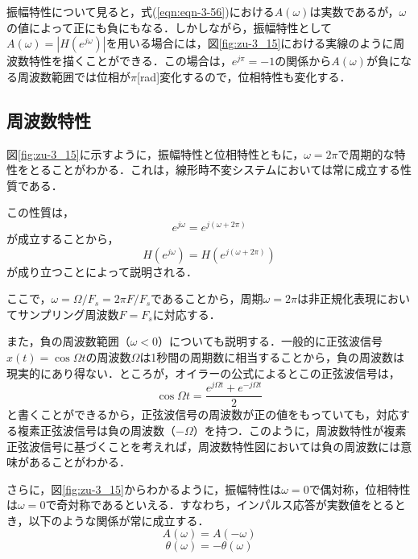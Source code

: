 振幅特性について見ると，式(\ref{eqn:eqn-3-56})における$A(\omega)$は実数であるが，$\omega$の値によって正にも負にもなる．しかしながら，振幅特性として$A(\omega)=|H(e^{j\omega})|$を用いる場合には，図\ref{fig:zu-3_15}における実線のように周波数特性を描くことができる．この場合は，$e^{j\pi}=-1$の関係から$A(\omega)$が負になる周波数範囲では位相が$\pi$[rad]変化するので，位相特性も変化する．


\subsection{周波数特性}

図\ref{fig:zu-3_15}に示すように，振幅特性と位相特性ともに，$\omega=2\pi$で周期的な特性をとることがわかる．これは，線形時不変システムにおいては常に成立する性質である．

この性質は，
\begin{equation}
e^{j\omega}=e^{j(\omega+2\pi)}
\end{equation}
が成立することから，
\begin{equation}
H(e^{j\omega})=H(e^{j(\omega+2\pi)})
\end{equation}
が成り立つことによって説明される．

ここで，$\omega=\Omega/F_s=2\pi F/F_s$であることから，周期$\omega=2\pi$は非正規化表現においてサンプリング周波数$F=F_s$に対応する．


また，負の周波数範囲（$\omega<0$）についても説明する．一般的に正弦波信号$x(t)=\cos \Omega t$の周波数$\Omega$は1秒間の周期数に相当することから，負の周波数は現実的にあり得ない．ところが，オイラーの公式によるとこの正弦波信号は，
\begin{equation}
\cos \Omega t = \frac{e^{j\Omega t}+e^{-j\Omega t}}{2}
\end{equation}
と書くことができるから，正弦波信号の周波数が正の値をもっていても，対応する複素正弦波信号は負の周波数（$-\Omega$）を持つ．このように，周波数特性が複素正弦波信号に基づくことを考えれば，周波数特性図においては負の周波数には意味があることがわかる．

さらに，図\ref{fig:zu-3_15}からわかるように，振幅特性は$\omega=0$で偶対称，位相特性は$\omega=0$で奇対称であるといえる．すなわち，インパルス応答が実数値をとるとき，以下のような関係が常に成立する．
\begin{equation}
A(\omega)=A(-\omega)
\label{eqn:eqn-3-59}
\end{equation}
\begin{equation}
\theta(\omega)=-\theta(\omega)
\label{eqn:eqn-3-60}
\end{equation}

